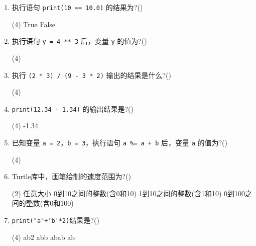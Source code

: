 \documentclass[11pt]{ctexart}
\begin{document}
    \begin{enumerate}
        \item 执行语句 \lstinline!print(10 == 10.0)! 的结果为?(\qquad)
        \begin{tasks}(4)
            \task True
            \task False
        \end{tasks}

        \item 执行语句 \lstinline!y = 4 ** 3! 后，变量 \lstinline{y} 的值为?(\qquad)
        \begin{tasks}(4)
        \end{tasks}

        \item 执行 \lstinline!(2 * 3) / (9 - 3 * 2)! 输出的结果是什么?(\qquad)
        \begin{tasks}(4)
        \end{tasks}

        \item  \lstinline!print(12.34 - 1.34)! 的输出结果是?(\qquad)
        \begin{tasks}(4)
            -1.34
        \end{tasks}

        \item 已知变量 \lstinline{a = 2}，\lstinline{b = 3}，执行语句 \lstinline!a %= a + b! 后，变量 \lstinline{a} 的值为?(\qquad)
        \begin{tasks}(4)
        \end{tasks}

        \item Turtle库中，画笔绘制的速度范围为?(\qquad)
        \begin{tasks}(2)
            \task 任意大小
            \task 0到10之间的整数(含0和10)
            \task 1到10之间的整数(含1和10)
            \task 0到100之间的整数(含0和100)
        \end{tasks}

        \item \lstinline!print("a"+'b'*2)!结果是?(\qquad)
        \begin{tasks}(4)
            \task ab2
            \task abb
            \task abab
            \task ab
        \end{tasks}


\end{enumerate}
\end{document}
